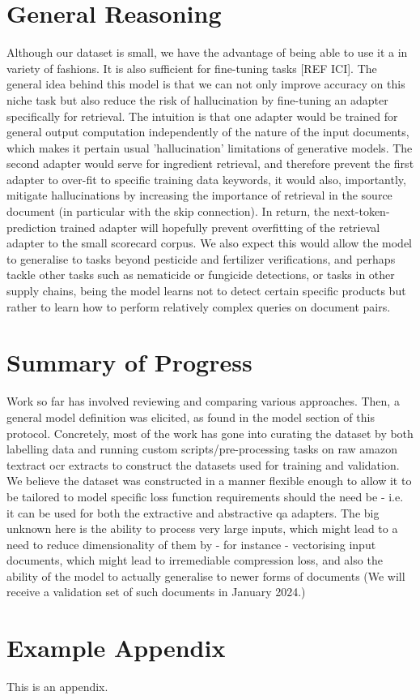\documentclass[11pt]{article}
\begin{document}
\section{General Reasoning} 

Although our dataset is small, we have the advantage of being able to use it a in variety of fashions. It is also sufficient for fine-tuning tasks [REF ICI].
The general idea behind this model is that we can not only improve accuracy on this niche task but also reduce the risk of hallucination by fine-tuning an adapter specifically for retrieval. The intuition is that one adapter would be trained for general output computation independently of the nature of the input documents, which makes it pertain usual 'hallucination' limitations of generative models. The second adapter would serve for ingredient retrieval, and therefore prevent the first adapter to over-fit to specific training data keywords, it would also, importantly, mitigate hallucinations by increasing the importance of retrieval in the source document (in particular with the skip connection). In return, the next-token-prediction trained adapter will hopefully prevent overfitting of the retrieval adapter to the small scorecard corpus.  
We also expect this would allow the model to generalise to tasks beyond pesticide and fertilizer verifications, and perhaps tackle other tasks such as nematicide or fungicide detections, or tasks in other supply chains, being the model learns not to detect certain specific products but rather to learn how to perform relatively complex queries on document pairs.


\section{Summary of Progress} 

Work so far has involved reviewing and comparing various approaches. Then, a general model definition was elicited, as found in the model section of this protocol.
Concretely, most of the work has gone into curating the dataset by both labelling data and running custom scripts/pre-processing tasks on raw amazon textract ocr extracts to construct the datasets used for training and validation. We believe the dataset was constructed in a manner flexible enough to allow it to be tailored to model specific loss function requirements should the need be - i.e. it can be used for both the extractive and abstractive qa adapters.
The big unknown here is the ability to process very large inputs, which might lead to a need to reduce dimensionality of them by - for instance - vectorising input documents, which might lead to irremediable compression loss, and also the ability of the model to actually generalise to newer forms of documents (We will receive a validation set of such documents in January 2024.)


\appendix

\section{Example Appendix}\label{sec:appendix}

This is an appendix.
\end{document}
